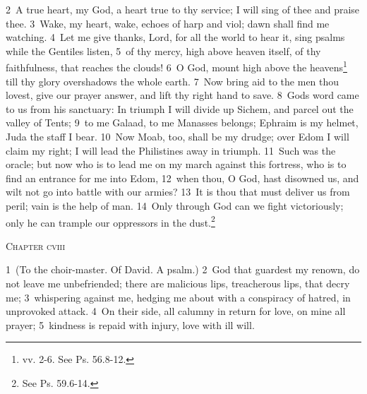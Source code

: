 \documentclass[10pt]{book} %
\begin{document}
\textcolor{benred8}{2}~A true heart, my God, a heart true to thy service; I will sing of thee and praise thee. \textcolor{benred8}{3}~Wake, my heart, wake, echoes of harp and viol; dawn shall find me watching. \textcolor{benred8}{4}~Let me give thanks, Lord, for all the world to hear it, sing psalms while the Gentiles listen, \textcolor{benred8}{5}~of thy mercy, high above heaven itself, of thy faithfulness, that reaches the clouds! \textcolor{benred8}{6}~O God, mount high above the heavens\footnote[1]{vv. 2-6. See Ps. 56.8-12.} till thy glory overshadows the whole earth. \textcolor{benred8}{7}~Now bring aid to the men thou lovest, give our prayer answer, and lift thy right hand to save. \textcolor{benred8}{8}~God\textquotesingle s word came to us from his sanctuary: In triumph I will divide up Sichem, and parcel out the valley of Tents; \textcolor{benred8}{9}~to me Galaad, to me Manasses belongs; Ephraim is my helmet, Juda the staff I bear. \textcolor{benred8}{10}~Now Moab, too, shall be my drudge; over Edom I will claim my right; I will lead the Philistines away in triumph. \textcolor{benred8}{11}~Such was the oracle; but now who is to lead me on my march against this fortress, who is to find an entrance for me into Edom, \textcolor{benred8}{12}~when thou, O God, hast disowned us, and wilt not go into battle with our armies? \textcolor{benred8}{13}~It is thou that must deliver us from peril; vain is the help of man. \textcolor{benred8}{14}~Only through God can we fight victoriously; only he can trample our oppressors in the dust.\footnote[2]{See Ps. 59.6-14.}
\begin{large}\begin{center}\textsc{Chapter cviii}\end{center}\end{large}
\textcolor{benred8}{1}~(To the choir-master. Of David. A psalm.)
\textcolor{benred8}{2}~God that guardest my renown, do not leave me unbefriended; there are malicious lips, treacherous lips, that decry me; \textcolor{benred8}{3}~whispering against me, hedging me about with a conspiracy of hatred, in unprovoked attack. \textcolor{benred8}{4}~On their side, all calumny in return for love, on mine all prayer; \textcolor{benred8}{5}~kindness is repaid with injury, love with ill will.
\end{document}
